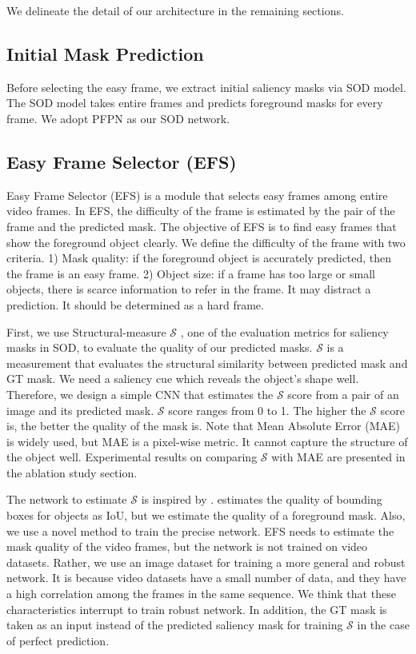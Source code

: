 \documentclass[letterpaper]{article} \usepackage{aaai22}  \usepackage{times}  \usepackage{helvet}  \usepackage{courier}  \usepackage[hyphens]{url}  \usepackage{graphicx} \urlstyle{rm} \def\UrlFont{\rm}  \usepackage{natbib}  \usepackage{caption} \DeclareCaptionStyle{ruled}{labelfont=normalfont,labelsep=colon,strut=off} \frenchspacing  \setlength{\pdfpagewidth}{8.5in}  \setlength{\pdfpageheight}{11in}  \usepackage{algorithm}
\begin{document}
We delineate the detail of our architecture in the remaining sections. 

\subsection{Initial Mask Prediction}

Before selecting the easy frame, we extract initial saliency masks via SOD model.
The SOD model takes entire frames and predicts foreground masks for every frame.
We adopt PFPN \citep{wang2020progressive} as our SOD network.

\subsection{Easy Frame Selector (EFS)}

Easy Frame Selector (EFS) is a module that selects easy frames among entire video frames. In EFS, the difficulty of the frame is estimated by the pair of the frame and the predicted mask. The objective of EFS is to find easy frames that show the foreground object clearly. We define the difficulty of the frame with two criteria. 1) Mask quality: if the foreground object is accurately predicted, then the frame is an easy frame.
2) Object size: if a frame has too large or small objects, there is scarce information to refer in the frame.  It may distract a prediction. It should be determined as a hard frame.

First, we use Structural-measure $\mathcal{S}$ \cite{fan2017structure}, one of the evaluation metrics for saliency masks in SOD, to evaluate the quality of our predicted masks.
$\mathcal{S}$ is a measurement that evaluates the structural similarity between predicted mask and GT mask. We need a saliency cue which reveals the object's shape well. Therefore, we design a simple CNN that estimates the $\mathcal{S}$ score from a pair of an image and its predicted mask. $\mathcal{S}$ score ranges from 0 to 1. The higher the $\mathcal{S}$ score is, the better the quality of the mask is.
Note that Mean Absolute Error (MAE) is widely used, but MAE is a pixel-wise metric. It cannot capture the structure of the object well. Experimental results on comparing $\mathcal{S}$ with MAE are presented in the ablation study section.

The network to estimate $\mathcal{S}$ is inspired by \citet{jiang2018acquisition}. \citet{jiang2018acquisition} estimates the quality of bounding boxes for objects as IoU, but we estimate the quality of a foreground mask. Also, we use a novel method to train the precise network. EFS needs to estimate the mask quality of the video frames, but the network is not trained on video datasets. Rather, we use an image dataset for training a more general and robust network. It is because video datasets have a small number of data, and they have a high correlation among the frames in the same sequence. We think that these characteristics interrupt to train robust network. In addition, the GT mask is taken as an input instead of the predicted saliency mask for training $\mathcal{S}$ in the case of perfect prediction.
\end{document}
